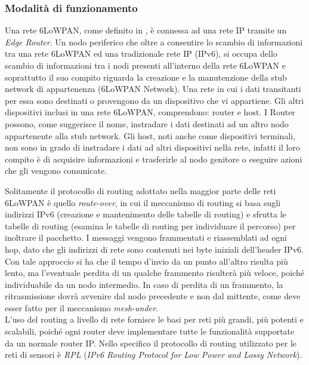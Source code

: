 \subsubsection{Modalità di funzionamento}
Una rete 6LoWPAN, come definito in \cite{olsson20146lowpan}, è connessa ad una rete IP tramite un \textit{Edge Router}. 
Un nodo periferico che oltre a consentire lo scambio di informazioni tra una rete 6LoWPAN ed una tradizionale rete IP (IPv6), si occupa dello scambio di informazioni tra i nodi presenti all'interno della rete 6LoWPAN e soprattutto il suo compito riguarda la creazione e la manutenzione della stub network di appartenenza (6LoWPAN Network). Una rete in cui i dati transitanti per essa sono destinati o provengono da un dispositivo che vi appartiene. Gli altri dispositivi inclusi in una rete 6LoWPAN, comprendono: router e host. I Router possono, come suggerisce il nome, instradare i dati destinati ad un altro nodo appartenente alla stub network. Gli host, noti anche come dispositivi terminali, non sono in grado di instradare i dati ad altri dispositivi nella rete, infatti il loro compito è di acquisire informazioni e trasferirle al nodo genitore o eseguire azioni che gli vengono comunicate.

\noindent Solitamente il protocollo di routing adottato nella maggior parte delle reti 6LoWPAN è quello \textit{route-over}, in cui il meccanismo di routing si basa sugli indirizzi IPv6 (creazione e mantenimento delle tabelle di routing) e sfrutta le tabelle di routing (esamina le tabelle di routing per individuare il percorso) per inoltrare il pacchetto. I messaggi vengono frammentati e riassemblati ad ogni hop, dato che gli indirizzi di rete sono contenuti nei byte iniziali dell'header IPv6. Con tale approccio si ha che il tempo d'invio da un punto all'altro risulta più lento, ma l'eventuale perdita di un qualche frammento risulterà più veloce, poiché individuabile da un nodo intermedio. In caso di perdita di un frammento, la ritrasmissione dovrà avvenire dal nodo precedente e non dal mittente, come deve esser fatto per il meccanismo \textit{mesh-under}.\\ 
L'uso del routing a livello di rete fornisce le basi per reti più grandi, più potenti e scalabili, poiché ogni router deve implementare tutte le funzionalità supportate da un normale router IP. Nello specifico il protocollo di routing utilizzato per le reti di sensori è \textit{RPL} (\textit{IPv6 Routing Protocol for Low Power and Lossy Network}).

